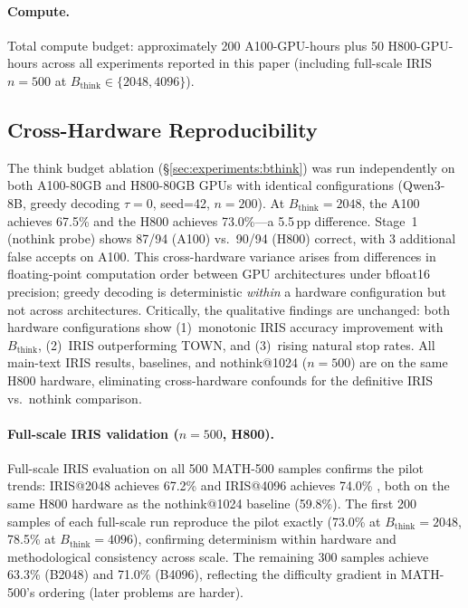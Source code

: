 \paragraph{Compute.}
Total compute budget: approximately 200 A100-GPU-hours plus 50 H800-GPU-hours across all
experiments reported in this paper (including full-scale IRIS $n{=}500$ at $B_{\text{think}} \in \{2048, 4096\}$).

\subsection{Cross-Hardware Reproducibility}
\label{app:cross-hardware}

The think budget ablation (\S\ref{sec:experiments:bthink}) was run independently on both A100-80GB and H800-80GB GPUs with identical configurations (Qwen3-8B, greedy decoding $\tau{=}0$, seed=42, $n{=}200$).
At $B_{\text{think}}{=}2048$, the A100 achieves 67.5\% and the H800 achieves 73.0\%---a 5.5\,pp difference.
Stage~1 (nothink probe) shows 87/94 (A100) vs.\ 90/94 (H800) correct, with 3 additional false accepts on A100.
This cross-hardware variance arises from differences in floating-point computation order between GPU architectures under bfloat16 precision; greedy decoding is deterministic \emph{within} a hardware configuration but not across architectures.
Critically, the qualitative findings are unchanged: both hardware configurations show (1)~monotonic IRIS accuracy improvement with $B_{\text{think}}$, (2)~IRIS outperforming TOWN, and (3)~rising natural stop rates.
All main-text IRIS results, baselines, and nothink@1024 ($n{=}500$) are on the same H800 hardware, eliminating cross-hardware confounds for the definitive IRIS vs.\ nothink comparison.

\paragraph{Full-scale IRIS validation ($n{=}500$, H800).}
Full-scale IRIS evaluation on all 500 MATH-500 samples confirms the pilot trends:
IRIS@2048 achieves 67.2\%  and IRIS@4096 achieves 74.0\% , both on the same H800 hardware as the nothink@1024 baseline (59.8\%).
The first 200 samples of each full-scale run reproduce the pilot exactly (73.0\% at $B_{\text{think}}{=}2048$, 78.5\% at $B_{\text{think}}{=}4096$), confirming determinism within hardware and methodological consistency across scale.
The remaining 300 samples achieve 63.3\% (B2048) and 71.0\% (B4096), reflecting the difficulty gradient in MATH-500's ordering (later problems are harder).

